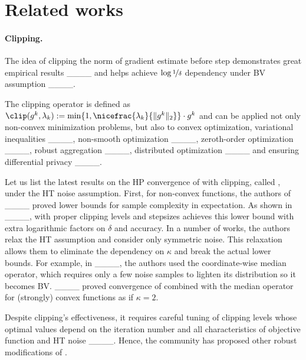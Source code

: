 \section{Related works}
\paragraph{Clipping.} The idea of clipping the norm of gradient estimate before  step demonstrates great empirical results ____ and helps achieve $\log \nicefrac{1}{\delta}$ dependency under BV assumption ____. 

The clipping operator is defined as $\clip(g^k, \lambda_k) := \min\{1, \nicefrac{\lambda_k}{\|g^k\|_2}\} \cdot g^k$ and can be applied not only 
non-convex minimization problems, but also to convex optimization, variational inequalities ____, non-smooth optimization ____, zeroth-order optimization ____, robust aggregation ____, distributed optimization ____ and ensuring differential privacy ____. %

Let us list the latest results on the HP convergence of  with clipping, called , under the HT noise assumption. First, for non-convex functions, the authors of ____ proved lower bounds for sample complexity in expectation. As shown in ____,  with proper clipping levels and stepsizes achieves this lower bound with extra logarithmic factors on $\delta$ and accuracy. In a number of works, the authors relax the HT assumption and consider only symmetric noise. This relaxation allows them to eliminate the dependency on $\kappa$ and break the actual lower bounds. For example, in ____,  the authors used the coordinate-wise median operator, which requires only a few noise samples to lighten its distribution so it becomes BV. ____ proved convergence of  combined with the median operator for (strongly) convex functions as if $\kappa = 2$. %

Despite clipping's effectiveness, it requires careful tuning of clipping levels whose optimal values depend on the iteration number and all characteristics of objective function and HT noise ____. Hence, the community has proposed other robust modifications of .   
 \vspace{-20pt}
